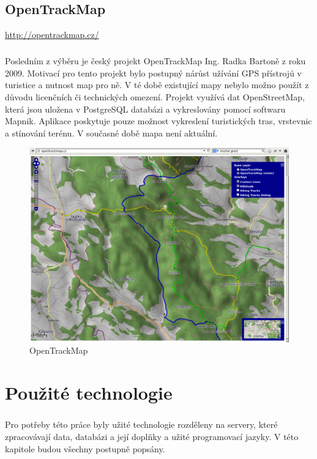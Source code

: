 \documentclass[11pt,a4paper,titlepage,oneside]{book}
\begin{document}
 	\section{OpenTrackMap}
		\url{http://opentrackmap.cz/}
		\paragraph{} Posledním z výběru je český projekt OpenTrackMap Ing. Radka Bartoně z roku 2009. Motivací pro tento projekt bylo postupný nárůst užívání GPS přístrojů v turistice a nutnost map pro ně. V té době existující mapy nebylo možno použít z důvodu licenčních či technických omezení\cite{OTM}. Projekt využívá dat OpenStreetMap, která jsou uložena v PostgreSQL databázi a vykreslovány pomocí softwaru Mapnik. Aplikace poskytuje pouze možnost vykreslení turistických tras, vrstevnic a stínování terénu. V současné době mapa není aktuální.
		\begin{figure}[!h]
			\begin{center}
				\includegraphics[width=12cm]{obrazky/otm.png}
				\caption{OpenTrackMap}
			\end{center}
		\end{figure}

\chapter{Použité technologie}
	\paragraph{} Pro potřeby této práce byly užité technologie rozděleny na servery, které zpracovávají data, databázi a její doplňky a užité programovací jazyky. V této kapitole budou všechny postupně popsány.
\end{document}
